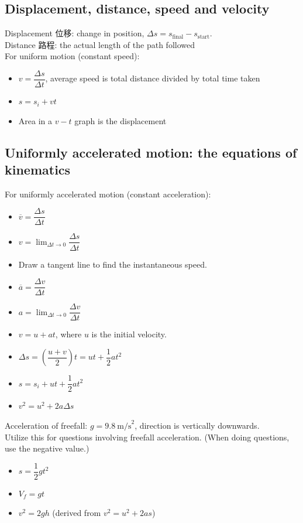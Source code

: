 \subsection{Displacement, distance, speed and velocity}
Displacement 位移: change in position, $\Delta s=s_{\text{final}}-s_{\text{start}}$.\\
Distance 路程: the actual length of the path followed\\
For uniform motion (constant speed):
\begin{itemize}
  \item $v=\dfrac{\Delta s}{\Delta t}$, average speed is total distance divided by total time taken
  \item $s=s_i+vt$
  \item Area in a $v-t$ graph is the displacement
\end{itemize}
\subsection{Uniformly accelerated motion: the equations of kinematics}
For uniformly accelerated motion (constant acceleration):
\begin{itemize}
  \item $\overline{v}=\dfrac{\Delta s}{\Delta t}$
  \item $\displaystyle v=\lim_{\Delta t \to 0}\dfrac{\Delta s}{\Delta t}$
  \item Draw a tangent line to find the instantaneous speed.
  \item $\overline{a}=\dfrac{\Delta v}{\Delta t}$
  \item $\displaystyle a=\lim_{\Delta t \to 0}\dfrac{\Delta v}{\Delta t}$
  \item $v=u+at$, where $u$ is the initial velocity.
  \item $\Delta s=\left(\dfrac{u+v}{2}\right)t=ut+\dfrac{1}{2}at^2$
  \item $s=s_i+ut+\dfrac{1}{2}at^2$
  \item $v^2=u^2+2a\Delta s$
\end{itemize}
Acceleration of freefall: $g=9.8\ \text{m/s}^2$, direction is vertically downwards.\\
Utilize this for questions involving freefall acceleration. (When doing questions, use the negative value.)
\begin{itemize}
\item $s=\dfrac{1}{2}gt^2$
\item $V_f=gt$
\item $v^2=2gh$ (derived from $v^2=u^2+2as$)
\end{itemize}


